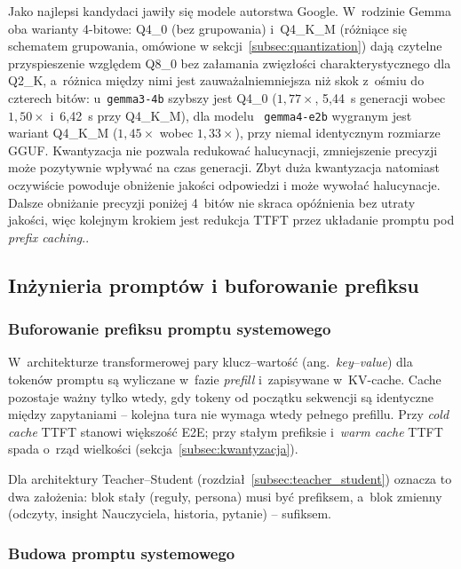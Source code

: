 Jako najlepsi kandydaci jawiły się modele autorstwa Google.
W~rodzinie Gemma oba warianty 4-bitowe: Q4\_0 (bez grupowania) i~Q4\_K\_M
(różniące się schematem grupowania, omówione w sekcji~\ref{subsec:quantization}) dają czytelne przyspieszenie względem
Q8\_0 bez załamania zwięzłości charakterystycznego dla Q2\_K, a~różnica między
nimi jest zauważalniemniejsza niż skok z~ośmiu do czterech bitów: u~\texttt{gemma3-4b}
szybszy jest Q4\_0 ($1{,}77\times$, 5{,}44~s generacji wobec $1{,}50\times$
i~6{,}42~s przy Q4\_K\_M), dla modelu ~\texttt{gemma4-e2b} wygranym jest wariant Q4\_K\_M
($1{,}45\times$ wobec $1{,}33\times$), przy niemal identycznym rozmiarze GGUF.
Kwantyzacja nie pozwala redukować halucynacji, zmniejszenie precyzji może pozytywnie wpływać na czas generacji. Zbyt duża kwantyzacja natomiast oczywiście powoduje obniżenie jakości odpowiedzi i może wywołać halucynacje.
Dalsze obniżanie precyzji poniżej 4~bitów nie skraca opóźnienia bez utraty
jakości, więc kolejnym krokiem jest redukcja TTFT przez układanie promptu
pod \emph{prefix caching}..
\subsection{Inżynieria promptów i buforowanie prefiksu}
\label{subsec:prefix_caching}

\subsubsection{Buforowanie prefiksu promptu systemowego}

W~architekturze transformerowej pary klucz--wartość (ang.\ \emph{key}--\emph{value})
dla tokenów promptu są wyliczane w~fazie \emph{prefill} i~zapisywane w~KV-cache.
Cache pozostaje ważny tylko wtedy, gdy tokeny od początku sekwencji są identyczne
między zapytaniami -- kolejna tura nie wymaga wtedy pełnego prefillu.
Przy \emph{cold cache} TTFT stanowi większość E2E; przy stałym prefiksie
i~\emph{warm cache} TTFT spada o~rząd wielkości (sekcja~\ref{subsec:kwantyzacja}).

Dla architektury Teacher--Student (rozdział~\ref{subsec:teacher_student}) oznacza to
dwa założenia: blok stały (reguły, persona) musi być prefiksem, a~blok zmienny
(odczyty, insight Nauczyciela, historia, pytanie) -- sufiksem.

\subsubsection{Budowa promptu systemowego}

